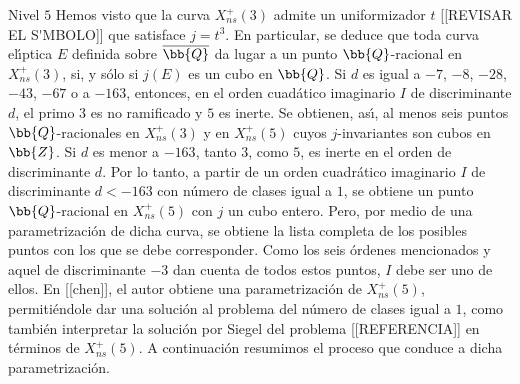 \begin{subsection}{Nivel $5$}
Hemos visto que la curva $X_{ns}^{+}(3)$ admite un uniformizador $t$
[[REVISAR EL S\'{\I}MBOLO]] que satisface $j=t^{3}$. En particular,
se deduce que toda curva el\'{\i}ptica $E$ definida sobre
$\overline{\bb{Q}}$ da lugar a un punto $\bb{Q}$-racional en
$X_{ns}^{+}(3)$, si, y s\'{o}lo si $j(E)$ es un cubo en $\bb{Q}$.
Si $d$ es igual a $-7$, $-8$, $-28$, $-43$, $-67$ o a $-163$, entonces, en
el orden cuad\'{a}tico imaginario $I$ de discriminante $d$, el primo $3$ es
no ramificado y $5$ es inerte. Se obtienen, as\'{\i}, al menos seis
puntos $\bb{Q}$-racionales en $X_{ns}^{+}(3)$ y en $X_{ns}^{+}(5)$ cuyos
$j$-invariantes son cubos en $\bb{Z}$. Si $d$ es menor a $-163$, tanto
$3$, como $5$, es inerte en el orden de discriminante $d$. Por lo tanto,
a partir de un orden cuadr\'{a}tico imaginario $I$ de discriminante $d<-163$
con n\'{u}mero de clases igual a $1$, se obtiene un punto $\bb{Q}$-racional
en $X_{ns}^{+}(5)$ con $j$ un cubo entero. Pero, por medio de una
parametrizaci\'{o}n de dicha curva, se obtiene la lista completa de los
posibles puntos con los que se debe corresponder. Como los seis \'{o}rdenes
mencionados y aquel de discriminante $-3$ dan cuenta de todos estos puntos,
$I$ debe ser uno de ellos. En [[chen]], el autor obtiene una
parametrizaci\'{o}n de $X_{ns}^{+}(5)$, permiti\'{e}ndole dar una
soluci\'{o}n al problema del n\'{u}mero de clases igual a $1$, como
tambi\'{e}n interpretar la soluci\'{o}n por Siegel del problema
[[REFERENCIA]] en t\'{e}rminos de $X_{ns}^{+}(5)$. A continuaci\'{o}n
resumimos el proceso que conduce a dicha parametrizaci\'{o}n.





\end{subsection}